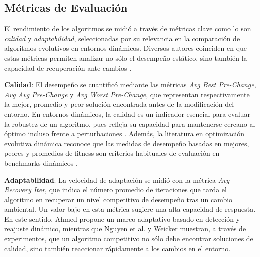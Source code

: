\documentclass[10pt]{article}
\begin{document}

\subsection*{Métricas de Evaluación}

El rendimiento de los algoritmos se midió a través de métricas clave como lo son \emph{calidad} y \emph{adaptabilidad}, seleccionadas por su relevancia en la comparación de algoritmos evolutivos en entornos dinámicos. Diversos autores coinciden en que estas métricas permiten analizar no sólo el desempeño estático, sino también la capacidad de recuperación ante cambios \cite{morrison2003performance}.

\textbf{Calidad}: El desempeño se cuantificó mediante las métricas \textit{Avg Best Pre-Change}, \textit{Avg Avg Pre-Change} y \textit{Avg Worst Pre-Change}, que representan respectivamente la mejor, promedio y peor solución encontrada antes de la modificación del entorno. En entornos dinámicos, la calidad es un indicador esencial para evaluar la robustez de un algoritmo, pues refleja su capacidad para mantenerse cercano al óptimo incluso frente a perturbaciones \cite{ahmed2024adaptive,morrison2003performance}. Además, la literatura en optimización evolutiva dinámica reconoce que las medidas de desempeño basadas en mejores, peores y promedios de fitness son criterios habituales de evaluación en benchmarks dinámicos \cite{nguyen2012survey,weicker1999es}.

\textbf{Adaptabilidad}: La velocidad de adaptación se midió con la métrica \textit{Avg Recovery Iter}, que indica el número promedio de iteraciones que tarda el algoritmo en recuperar un nivel competitivo de desempeño tras un cambio ambiental. Un valor bajo en esta métrica sugiere una alta capacidad de respuesta. En este sentido, Ahmed \cite{ahmed2024adaptive} propone un marco adaptativo basado en detección y reajuste dinámico, mientras que Nguyen et al. \cite{nguyen2013kd} y Weicker \cite{weicker1999es} muestran, a través de experimentos, que un algoritmo competitivo no sólo debe encontrar soluciones de calidad, sino también reaccionar rápidamente a los cambios en el entorno.
\end{document}
